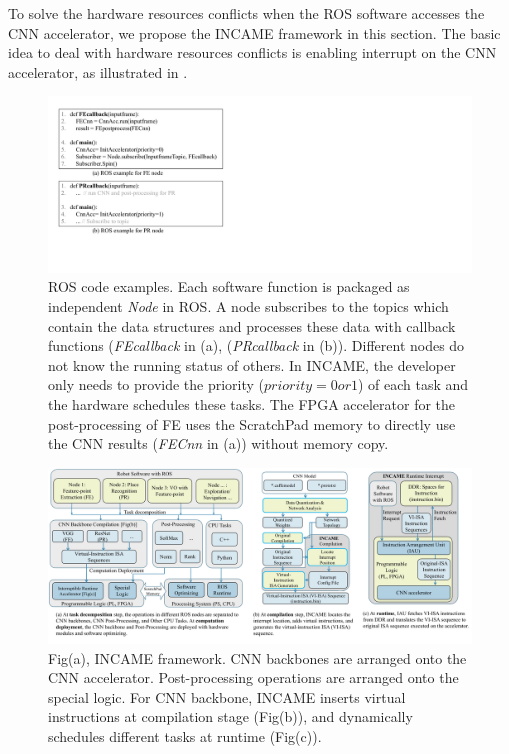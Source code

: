 \label{sec:incame}

To solve the hardware resources conflicts when the ROS software accesses the CNN accelerator, we propose the INCAME framework in this section. The basic idea to deal with hardware resources conflicts is enabling interrupt on the CNN accelerator, as illustrated in .



\begin{figure}[t]
	\centering
    \includegraphics[width=0.9\linewidth]{fig/codeexample.pdf}
    \vspace{-6mm}
    \caption{ ROS code examples. Each software function is packaged as independent \textit{Node} in ROS. A node subscribes to the topics which contain the data structures and processes these data with callback functions (\textit{FEcallback} in (a), (\textit{PRcallback} in (b)). Different nodes do not know the running status of others. In INCAME, the developer only needs to provide the priority ($priority=0 or 1$) of each task and the hardware schedules these tasks. The FPGA accelerator for the post-processing of FE uses the ScratchPad memory to directly use the CNN results (\textit{FECnn} in (a)) without memory copy. 
    }
	\label{fig:rosexample}
\end{figure}

\begin{figure}[t]
	\centering
    \includegraphics[width=0.99\linewidth]{fig/incame.pdf}
    \vspace{-1mm} 
    \caption{ Fig(a), INCAME framework. CNN backbones are arranged onto the CNN accelerator. Post-processing operations are arranged onto the special logic. For CNN backbone, INCAME inserts virtual instructions at compilation stage (Fig(b)), and dynamically schedules different tasks at runtime (Fig(c)). }
	\label{fig:incame}
\end{figure}

